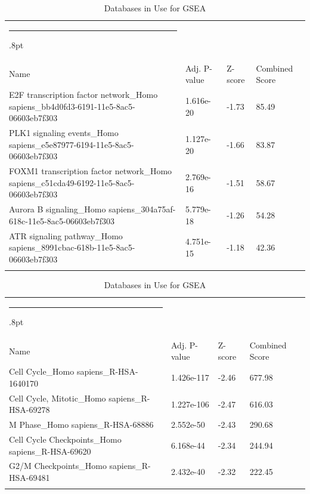\documentclass[3p,authoryear,preprint,12pt]{elsarticle}
\makeatletter
\def\hlinewd#1{%
  \noalign{\ifnum0=`}\fi\hrule \@height #1%
  \futurelet\reserved@a\@xhline}
\def\tbltoprule{\hlinewd{.8pt}\\[-12pt]}
\def\tblbottomrule{\noalign{\vspace*{6pt}}\hline\noalign{\vspace*{2pt}}}
\def\tblmidrule{\noalign{\vspace*{6pt}}\hline\noalign{\vspace*{2pt}}}
\makeatother
\begin{document}
\begin{table}[!htbp]
	\caption{{Databases in Use for GSEA} }
	\label{tw-de478ae31cc6}
	\def\arraystretch{1}
	\ignorespaces 
	\centering 
	\begin{tabulary}{\linewidth}{p{\dimexpr.65\tabcolsep}p{\dimexpr.15\tabcolsep}p{\dimexpr.1\tabcolsep}p{\dimexpr.1\tabcolsep}}
		\tbltoprule Name & Adj. P-value & Z-score & Combined Score\\
		\tblmidrule
E2F transcription factor network\_Homo sapiens\_bb4d0fd3-6191-11e5-8ac5-06603eb7f303 & 1.616e-20 & -1.73 & 85.49 \\
PLK1 signaling events\_Homo sapiens\_e5e87977-6194-11e5-8ac5-06603eb7f303 & 1.127e-20 & -1.66 & 83.87 \\
FOXM1 transcription factor network\_Homo sapiens\_c51cda49-6192-11e5-8ac5-06603eb7f303 & 2.769e-16 & -1.51 & 58.67 \\
Aurora B signaling\_Homo sapiens\_304a75af-618c-11e5-8ac5-06603eb7f303 & 5.779e-18 & -1.26 & 54.28 \\
ATR signaling pathway\_Homo sapiens\_8991cbac-618b-11e5-8ac5-06603eb7f303 & 4.751e-15 & -1.18 & 42.36 \\
		\tblbottomrule
	\end{tabulary}\par 
\end{table}
\begin{table}[!htbp]
	\caption{{Databases in Use for GSEA} }
	\label{tw-de478ae31cc6}
	\def\arraystretch{1}
	\ignorespaces 
	\centering 
	\begin{tabulary}{\linewidth}{p{\dimexpr.65\tabcolsep}p{\dimexpr.15\tabcolsep}p{\dimexpr.1\tabcolsep}p{\dimexpr.1\tabcolsep}}
		\tbltoprule Name & Adj. P-value & Z-score & Combined Score\\
		\tblmidrule
Cell Cycle\_Homo sapiens\_R-HSA-1640170 & 1.426e-117 & -2.46 & 677.98 \\
Cell Cycle, Mitotic\_Homo sapiens\_R-HSA-69278 & 1.227e-106 & -2.47 & 616.03 \\
M Phase\_Homo sapiens\_R-HSA-68886 & 2.552e-50 & -2.43 & 290.68 \\
Cell Cycle Checkpoints\_Homo sapiens\_R-HSA-69620 & 6.168e-44 & -2.34 & 244.94 \\
G2/M Checkpoints\_Homo sapiens\_R-HSA-69481 & 2.432e-40 & -2.32 & 222.45 \\
		\tblbottomrule
	\end{tabulary}\par 
\end{table}
\end{document}
